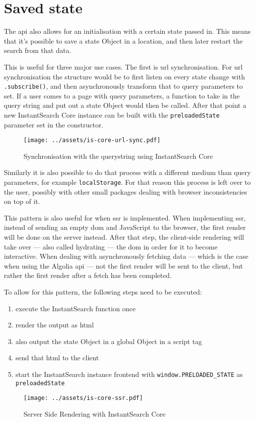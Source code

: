 
\section{Saved state} %
\label{sec:saved_state}

The \acrshort{api} also allows for an initialisation with a certain state passed in. This means that it's possible to save a state Object in a location, and then later restart the search from that data. 

This is useful for three major use cases. The first is \acrshort{url} synchronisation. For \acrshort{url} synchronisation the structure would be to first listen on every state change with {\tt .subscribe()}, and then asynchronously transform that to query parameters to set. If a user comes to a page with query parameters, a function to take in the query string and put out a state Object would then be called. After that point a new InstantSearch Core instance can be built with the {\tt preloadedState} parameter set in the constructor.

\begin{figure}[H]
  \centering
  \texttt{[image: ../assets/is-core-url-sync.pdf]}
  \caption{Synchronisation with the querystring using InstantSearch Core}
  \label{figure:is-core-url-sync}
\end{figure} %

Similarly it is also possible to do that process with a different medium than query parameters, for example {\tt localStorage}. For that reason this process is left over to the user, possibly with other small packages dealing with browser inconsistencies on top of it. 

This pattern is also useful for when \acrfull{ssr} is implemented. When implementing \acrlong{ssr}, instead of sending an empty \acrshort{dom} and JavaScript to the browser, the first render will be done on the server instead. After that step, the client-side rendering will take over --- also called hydrating --- the \acrshort{dom} in order for it to become interactive. When dealing with asynchronously fetching data --- which is the case when using the Algolia \acrshort{api} --- not the first render will be sent to the client, but rather the first render after a fetch has been completed.

To allow for this pattern, the following steps need to be executed:

\begin{enumerate}
  \item execute the InstantSearch function once
  \item render the output as html
  \item also output the state Object in a global Object in a script tag
  \item send that html to the client
  \item start the InstantSearch instance frontend with {\tt window.PRELOADED\_STATE} as {\tt preloadedState}
\end{enumerate}

\begin{figure}[H]
  \centering
  \texttt{[image: ../assets/is-core-ssr.pdf]}
  \caption{Server Side Rendering with InstantSearch Core}
  \label{figure:is-core-ssr}
\end{figure} %

